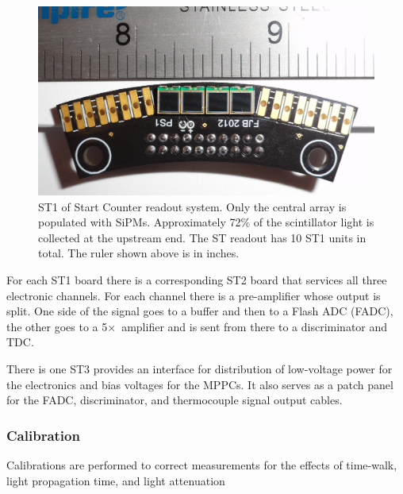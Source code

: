 \begin{figure}[!htb]
  \centering
  \includegraphics[width=1.0\columnwidth]{figures/st1_ruler}
  \caption{ST1 of Start Counter readout system.  Only the central array 
    is populated with SiPMs.  Approximately 72\% of the scintillator light 
    is collected at the upstream end.  The ST readout has 10 ST1 units in 
    total.  The ruler shown above is in inches.}
  \label{fig:st-ST1}
\end{figure}

For each ST1 board there is a corresponding ST2 board that services
all three electronic channels. For each channel there is a
pre-amplifier whose output is split. One side of the signal goes to a
buffer and then to a Flash ADC (FADC), the other goes to a
5$\times$~amplifier and is sent from there to a discriminator and TDC.

There is one ST3 provides an interface for distribution of low-voltage
power for the electronics and bias voltages for the MPPCs. It also
serves as a patch panel for the FADC, discriminator, and thermocouple
signal output cables.

\subsubsection{Calibration}

Calibrations are performed to correct measurements for the effects of
time-walk, light propagation time, and light attenuation

